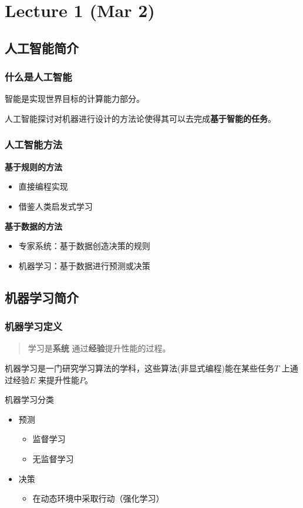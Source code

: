 
\chapter{Lecture 1 (Mar 2)}
\section{人工智能简介}
\subsection{什么是人工智能}
智能是实现世界目标的计算能力部分。

人工智能探讨对机器进行设计的方法论使得其可以去完成\textbf{基于智能的任务}。
\subsection{人工智能方法}
\noindent \textbf{基于规则的方法}
\begin{itemize}
		\item 直接编程实现
		\item 借鉴人类启发式学习
\end{itemize}

\noindent \textbf{基于数据的方法}
\begin{itemize}
		\item 专家系统：基于数据创造决策的规则
		\item 机器学习：基于数据进行预测或决策
\end{itemize}
\section{机器学习简介}
\subsection{机器学习定义}
\begin{quotation}
		学习是\textbf{系统} 通过\textbf{经验}提升性能的过程。
\end{quotation}
\begin{defi}
		机器学习是一门研究学习算法的学科，这些算法(非显式编程)能在某些任务$T$ 上通过经验$E$ 来提升性能$P$。
\end{defi}

\noindent 机器学习分类
\begin{itemize}
		\item 预测
				\begin{itemize}
						\item 监督学习
						\item 无监督学习
				\end{itemize}
		\item 决策
				\begin{itemize}
						\item 在动态环境中采取行动（强化学习）
				\end{itemize}
\end{itemize}

